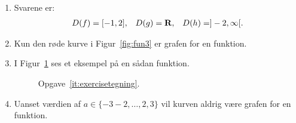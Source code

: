 \begin{enumerate}
	\item Svarene er:
	\begin{align*}
	D(f)=[-1,2],&& D(g)=\mathbf{R},&& D(h)=]-2,\infty[.
	\end{align*}
	
	\item \label{it:fun3} Kun den røde kurve i Figur~\ref{fig:fun3} er grafen for en funktion.
	

	\item\label{it:exercisetegning} I Figur~\ref{fig:fun35} ses et eksempel på en sådan funktion.
	\begin{figure}
		\centering
		\caption{Opgave~\ref{it:exercisetegning}.}
		\label{fig:fun35}
	\end{figure}
	
	
	\item Uanset værdien af $a\in \{-3-2,\dots,2,3\}$ vil kurven aldrig være grafen for en funktion.
\end{enumerate}